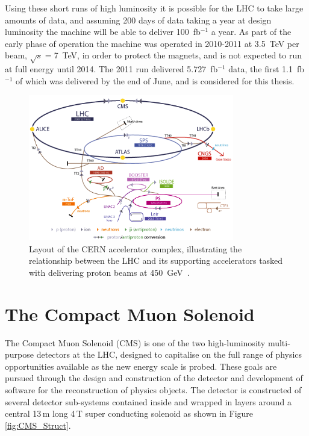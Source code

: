 Using these short runs of high luminosity it is possible for the LHC to take large amounts of data, and assuming 200 days of data taking a year  at design luminosity the machine will be able to deliver 100~fb$^{-1}$ a year. As part of the early phase of operation the machine was operated in 2010-2011 at 3.5~TeV per beam, $\sqrt{s} = $7~TeV, in order to protect the magnets, and is not expected to run at full energy until 2014. The 2011 run delivered 5.727~fb$^{-1}$ data, the first 1.1~fb$^{-1}$ of which was delivered by the end of June, and is considered for this thesis.

\begin{figure}[htbp]
\centering
\includegraphics[width=0.8\textwidth]{Figures/Detector/injection}
\caption[Layout of the CERN accelerator complex, illustrating the relationship between the LHC and its supporting accelerators tasked with delivering proton beams at 450~GeV.]{Layout of the CERN accelerator complex, illustrating the relationship between the LHC and its supporting accelerators tasked with delivering proton beams at 450~GeV~\cite{Christiane}.}
\label{fig:LHCinject}
\end{figure}



\section{The Compact Muon Solenoid}

The Compact Muon Solenoid (CMS) is one of the two high-luminosity multi-purpose detectors at the LHC, designed to capitalise on the full range of physics opportunities available as the new energy scale is probed. These goals are pursued through the design and construction of the detector and development of software for the reconstruction of physics objects. The detector is constructed of several detector sub-systems contained inside and wrapped in layers around a central 13\,m long 4\,T super conducting solenoid as shown in Figure \ref{fig:CMS_Struct}. 

